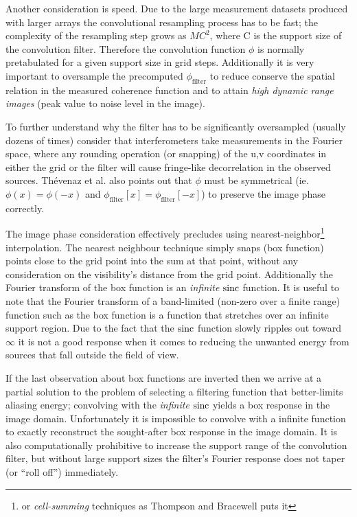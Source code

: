  Another consideration is speed. Due to the large measurement datasets produced with larger arrays the convolutional resampling process
 has to be fast; the complexity of the resampling step grows as $MC^2$, where C is the support size of the convolution filter. Therefore
 the convolution function $\phi$ is normally pretabulated for a given support size in grid steps. Additionally it is very important to oversample
 the precomputed $\phi_{\text{filter}}$ to reduce conserve the spatial relation in the measured coherence function and to 
 attain \emph{high dynamic range images} (peak value to noise level in the image).
 
 To further understand why the filter has to be significantly oversampled (usually dozens of times) consider that interferometers take measurements 
 in the Fourier space, where any rounding operation (or snapping) of the u,v coordinates in either the grid
 or the filter will cause fringe-like decorrelation in the observed sources. Th\'evenaz et al. \cite{thevenaz2000image} also
 points out that $\phi$ must be symmetrical (ie. $\phi{(x)} = \phi{(-x)}$ and $\phi_{\text{filter}}[x] = \phi_{\text{filter}}[-x]$) to preserve 
 the image phase correctly.

 The image phase consideration effectively precludes using nearest-neighbor\footnote{or \textit{cell-summing} techniques as 
 Thompson and Bracewell \cite{thompson1974interpolation} puts it} interpolation. The nearest neighbour technique simply snaps (box function) 
 points close to the grid point into the sum at that point, without any consideration on the visibility's distance from the grid point. Additionally 
 the Fourier transform of the box function is an \emph{infinite} $\operatorname*{sinc}$ function. It is useful to note that the Fourier transform of a 
 band-limited (non-zero over a finite range) function such as the box function is a function that stretches over an infinite 
 support region. Due to the fact that the $\operatorname*{sinc}$ function slowly ripples out toward $\infty$ it is not a good response 
 when it comes to reducing the unwanted energy from sources that fall outside the field of view.
 
 If the last observation about box functions are inverted then we arrive at a partial solution to the problem of selecting a filtering function
 that better-limits aliasing energy; convolving with the \emph{infinite} $\operatorname*{sinc}$ yields a box response in the image domain. Unfortunately it is 
 impossible to convolve with a infinite function to exactly reconstruct the sought-after box response in the image domain. It is also computationally
 prohibitive to increase the support range of the convolution filter, but without large support sizes the filter's Fourier response does not taper (or 
 ``roll off'') immediately.
 
